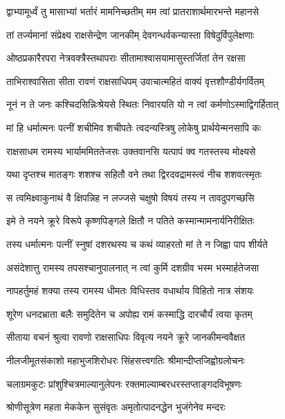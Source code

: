 \twolineshloka
{द्वाभ्यामूर्ध्वं तु मासाभ्यां भर्तारं मामनिच्छतीम्}
{मम त्वां प्रातराशार्थमारभन्ते महानसे} %

\twolineshloka
{तां तर्ज्यमानां संप्रेक्ष्य राक्षसेन्द्रेण जानकीम्}
{देवगन्धर्वकन्यास्ता विषेदुर्विपुलेक्षणाः} %

\twolineshloka
{ओष्ठप्रकारैरपरा नेत्रवक्त्रैस्तथापराः}
{सीतामाश्वासयामासुस्तर्जितां तेन रक्षसा} %

\twolineshloka
{ताभिराश्वासिता सीता रावणं राक्षसाधिपम्}
{उवाचात्महितं वाक्यं वृत्तशौण्डीर्यगर्वितम्} %

\twolineshloka
{नूनं न ते जनः कश्चिदसिन्निःश्रेयसे स्थितः}
{निवारयति यो न त्वां कर्मणोऽस्माद्विगर्हितात्} %

\twolineshloka
{मां हि धर्मात्मनः पत्नीं शचीमिव शचीपतेः}
{त्वदन्यस्त्रिषु लोकेषु प्रार्थयेन्मनसापि कः} %

\twolineshloka
{राक्षसाधम रामस्य भार्याममिततेजसः}
{उक्तवानसि यत्पापं क्व गतस्तस्य मोक्ष्यसे} %

\twolineshloka
{यथा दृप्तश्च मातङ्गः शशश्च सहितौ वने}
{तथा द्विरदवद्रामस्त्वं नीच शशवत्स्मृतः} %

\twolineshloka
{स त्वमिक्ष्वाकुनाथं वै क्षिपन्निह न लज्जसे}
{चक्षुषो विषयं तस्य न तावदुपगच्छसि} %

\twolineshloka
{इमे ते नयने क्रूरे विरूपे कृष्णपिङ्गले}
{क्षितौ न पतिते कस्मान्मामनार्यनिरीक्षितः} %

\twolineshloka
{तस्य धर्मात्मनः पत्नीं स्नुषां दशरथस्य च}
{कथं व्याहरतो मां ते न जिह्वा पाप शीर्यते} %

\twolineshloka
{असंदेशात्तु रामस्य तपसश्चानुपालनात्}
{न त्वां कुर्मि दशग्रीव भस्म भस्मार्हतेजसा} %

\twolineshloka
{नापहर्तुमहं शक्या तस्य रामस्य धीमतः}
{विधिस्तव वधार्थाय विहितो नात्र संशयः} %

\twolineshloka
{शूरेण धनदभ्राता बलैः समुदितेन च}
{अपोह्य रामं कस्माद्धि दारचौर्यं त्वया कृतम्} %

\twolineshloka
{सीताया वचनं श्रुत्वा रावणो राक्षसाधिपः}
{विवृत्य नयने क्रूरे जानकीमन्ववैक्षत} %

\twolineshloka
{नीलजीमूतसंकाशो महाभुजशिरोधरः}
{सिंहसत्त्वगतिः श्रीमान्दीप्तजिह्वोग्रलोचनः} %

\twolineshloka
{चलाग्रमकुटः प्रांशुश्चित्रमाल्यानुलेपनः}
{रक्तमाल्याम्बरधरस्तप्ताङ्गदविभूषणः} %

\twolineshloka
{श्रोणीसूत्रेण महता मेककेन सुसंवृतः}
{अमृतोत्पादनद्धेन भुजंगेनेव मन्दरः} %

